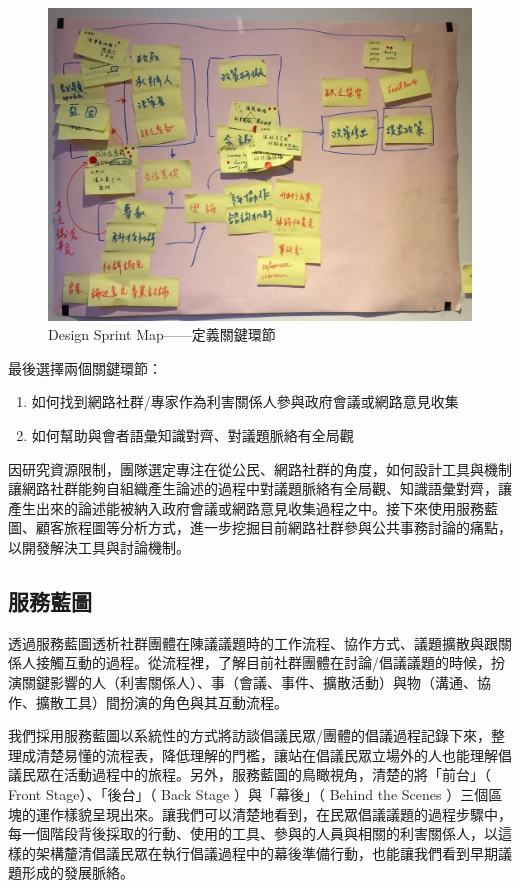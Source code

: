 \documentclass[12pt,a4paper]{article}
\begin{document}
\begin{figure}[htbp]
\centering
\includegraphics[width=.9\linewidth]{./images/design_sprint_map.jpg}
\caption{\label{fig:orgde50e92}
Design Sprint Map——定義關鍵環節}
\end{figure}

最後選擇兩個關鍵環節：
\begin{enumerate}
\item 如何找到網路社群/專家作為利害關係人參與政府會議或網路意見收集
\item 如何幫助與會者語彙知識對齊、對議題脈絡有全局觀
\end{enumerate}

因研究資源限制，團隊選定專注在從公民、網路社群的角度，如何設計工具與機制讓網路社群能夠自組織產生論述的過程中對議題脈絡有全局觀、知識語彙對齊，讓產生出來的論述能被納入政府會議或網路意見收集過程之中。接下來使用服務藍圖、顧客旅程圖等分析方式，進一步挖掘目前網路社群參與公共事務討論的痛點，以開發解決工具與討論機制。
\subsection{服務藍圖}
\label{sec:org8bf252e}
透過服務藍圖透析社群團體在陳議議題時的工作流程、協作方式、議題擴散與跟關係人接觸互動的過程。從流程裡，了解目前社群團體在討論/倡議議題的時候，扮演關鍵影響的人（利害關係人）、事（會議、事件、擴散活動）與物（溝通、協作、擴散工具）間扮演的角色與其互動流程。

我們採用服務藍圖以系統性的方式將訪談倡議民眾/團體的倡議過程記錄下來，整理成清楚易懂的流程表，降低理解的門檻，讓站在倡議民眾立場外的人也能理解倡議民眾在活動過程中的旅程。另外，服務藍圖的鳥瞰視角，清楚的將「前台」（ Front Stage）、「後台」（ Back Stage ）與「幕後」（ Behind the Scenes ）三個區塊的運作樣貌呈現出來。讓我們可以清楚地看到，在民眾倡議議題的過程步驟中，每一個階段背後採取的行動、使用的工具、參與的人員與相關的利害關係人，以這樣的架構釐清倡議民眾在執行倡議過程中的幕後準備行動，也能讓我們看到早期議題形成的發展脈絡。
\end{document}
